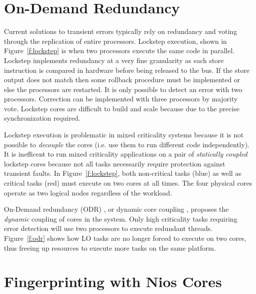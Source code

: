 \section{On-Demand Redundancy}

	Current solutions to transient errors typically rely on redundancy and voting through the replication of entire processors. 
	Lockstep execution, shown in Figure~\ref{f:lockstep} is when two processors execute the same code in parallel. 
	Lockstep implements redundancy at a very fine granularity as each store instruction is compared in hardware before being released to the bus. 
	If the store output does not match then some rollback procedure must be implemented or else the processors are restarted. 
	It is only possible to detect an error with two processors. 
	Correction can be implemented with three processors by majority vote. Lockstep cores are difficult to build and scale because due to the precise synchronization required.

	Lockstep execution is problematic in mixed criticality systems because it is not possible to \emph{decouple} the cores (i.e. use them to run different code independently). 
	It is inefficent to run mixed criticality applications on a pair of \emph{statically coupled} lockstep cores because not all tasks necessarily require protection against transient faults. 
	In Figure~\ref{f:lockstep}, both non-critical tasks (blue) as well as critical tasks (red) must execute on two cores at all times. 	
	The four physical cores operate as two logical nodes regardless of the workload.

	On-Demand redundancy (ODR) \cite{Meyer:CASES11,fu2013demand}, or dynamic core coupling \cite{lafrieda2007utilizing}, proposes the \emph{dynamic} coupling of cores in the system. 
	Only high criticality tasks requiring error detection will use two processors to execute redundant threads. 
	Figure~\ref{f:odr} shows how LO tasks are no longer forced to execute on two cores, thus freeing up resources to execute more tasks on the same platform.




\section{Fingerprinting with Nios Cores}

